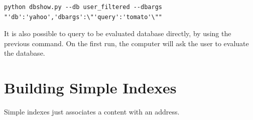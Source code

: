 \documentclass{report}
\begin{document}
\begin{lstlisting}
python dbshow.py --db user_filtered --dbargs "'db':'yahoo','dbargs':\"'query':'tomato'\""

\end{lstlisting}







It is also possible to query to be evaluated database directly, by using the previous command. 
On the first run, the computer will ask the user to evaluate the database.







\section{Building Simple Indexes}
Simple indexes just associates a content with an address.
\end{document}
